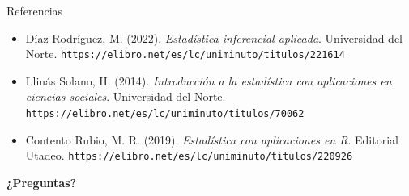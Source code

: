 \documentclass[aspectratio=169,10pt]{beamer}
\begin{document}
\begin{frame}{Referencias}
  \footnotesize
  \begin{itemize}
    \item[{[1]}] Díaz Rodríguez, M. (2022). \textit{Estadística inferencial
      aplicada}. Universidad del Norte.
      \texttt{https://elibro.net/es/lc/uniminuto/titulos/221614}
    \item[{[2]}] Llinás Solano, H. (2014). \textit{Introducción a la
      estadística con aplicaciones en ciencias sociales}. Universidad del
      Norte. \texttt{https://elibro.net/es/lc/uniminuto/titulos/70062}
    \item[{[3]}] Contento Rubio, M. R. (2019). \textit{Estadística con
      aplicaciones en R}. Editorial Utadeo.
      \texttt{https://elibro.net/es/lc/uniminuto/titulos/220926}
  \end{itemize}

  \vspace{0.35cm}
  \begin{center}
    {\Large\color{uniAzul}\textbf{¿Preguntas?}}
  \end{center}
\end{frame}
\end{document}
